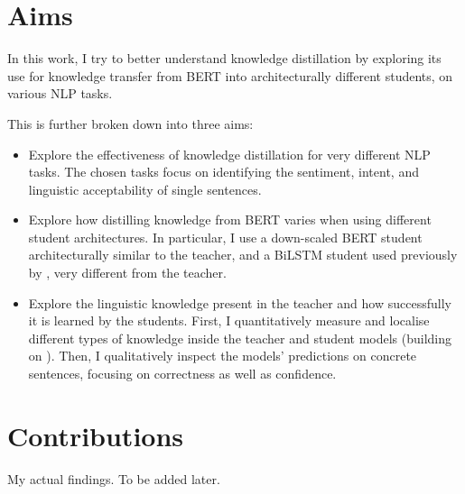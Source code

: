 \documentclass[bsc,frontabs,singlespacing,parskip,deptreport]{infthesis}
\begin{document}
{  %
  \section{Aims}{
    In this work, I try to better understand knowledge distillation by exploring its use for knowledge transfer from BERT into architecturally different students, on various NLP tasks.

    This is further broken down into three aims:
    \begin{itemize}
      \item{
        Explore the effectiveness of knowledge distillation for very different NLP tasks. 
        The chosen tasks focus on identifying the sentiment, intent, and linguistic acceptability of single sentences.
        }
      \item{
        Explore how distilling knowledge from BERT varies when using different student architectures.
        In particular, I use a down-scaled BERT student architecturally similar to the teacher, and a BiLSTM student used previously by \citet{Tang_2019a,Tang_2019b}, very different from the teacher.
        }
      \item{
        Explore the linguistic knowledge present in the teacher and how successfully it is learned by the students.
        First, I quantitatively measure and localise different types of knowledge inside the teacher and student models (building on \citet{Conneau_2018,Tenney_2019b}).
        Then, I qualitatively inspect the models' predictions on concrete sentences, focusing on correctness as well as confidence.
      }
    \end{itemize}
  }
  
  \section{Contributions}{
    My actual findings. To be added later.
  }
}
\end{document}
